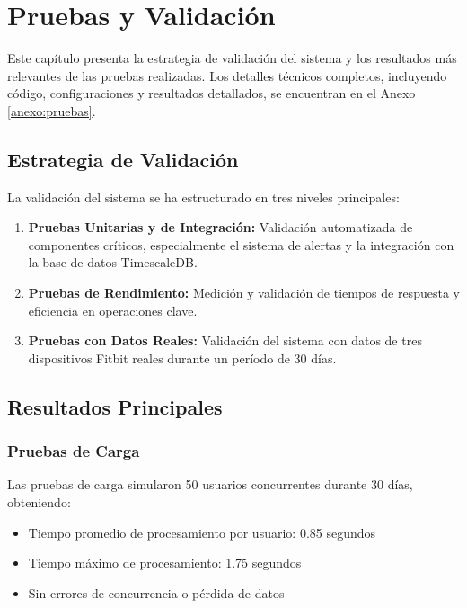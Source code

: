 \chapter{Pruebas y Validación}
\label{chap:pruebas_validacion}

Este capítulo presenta la estrategia de validación del sistema y los resultados más relevantes de las pruebas realizadas. Los detalles técnicos completos, incluyendo código, configuraciones y resultados detallados, se encuentran en el Anexo \ref{anexo:pruebas}.

\section{Estrategia de Validación}
\label{sec:estrategia_validacion}

La validación del sistema se ha estructurado en tres niveles principales:

\begin{enumerate}
    \item \textbf{Pruebas Unitarias y de Integración:} Validación automatizada de componentes críticos, especialmente el sistema de alertas y la integración con la base de datos TimescaleDB.
    \item \textbf{Pruebas de Rendimiento:} Medición y validación de tiempos de respuesta y eficiencia en operaciones clave.
    \item \textbf{Pruebas con Datos Reales:} Validación del sistema con datos de tres dispositivos Fitbit reales durante un período de 30 días.
\end{enumerate}

\section{Resultados Principales}
\label{sec:resultados_principales}

\subsection{Pruebas de Carga}
Las pruebas de carga simularon 50 usuarios concurrentes durante 30 días, obteniendo:
\begin{itemize}
    \item Tiempo promedio de procesamiento por usuario: 0.85 segundos
    \item Tiempo máximo de procesamiento: 1.75 segundos
    \item Sin errores de concurrencia o pérdida de datos
\end{itemize}

